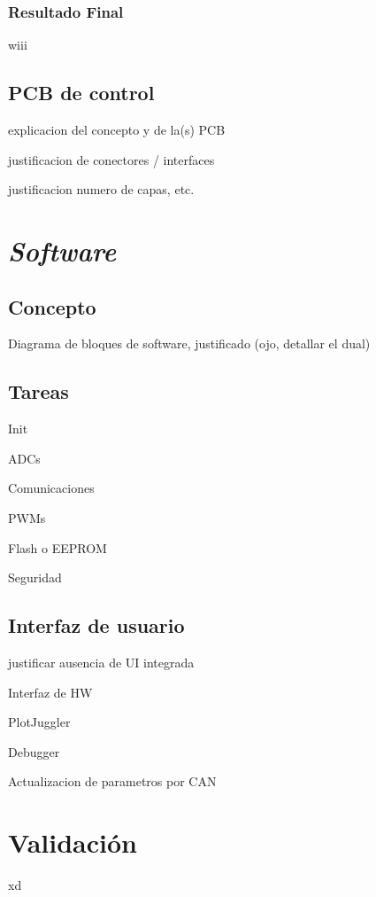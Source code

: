 \subsubsection{Resultado Final}
wiii

\subsection{PCB de control}

explicacion del concepto y de la(s) PCB

justificacion de conectores / interfaces

justificacion numero de capas, etc.


\section{\textit{Software}}

\subsection{Concepto}

Diagrama de bloques de software, justificado (ojo, detallar el dual)


\subsection{Tareas}

Init

ADCs

Comunicaciones

PWMs

Flash o EEPROM

Seguridad

\subsection{Interfaz de usuario}

justificar ausencia de UI integrada

Interfaz de HW 

PlotJuggler

Debugger

Actualizacion de parametros por CAN

\section{Validación}
xd


